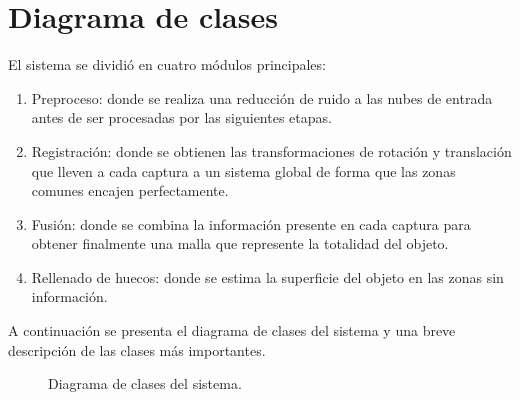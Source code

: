 \section{Diagrama de clases}
El sistema se dividió en cuatro módulos principales:
\begin{enumerate}
	\item Preproceso:
		donde se realiza una reducción de ruido a las nubes de entrada
		antes de ser procesadas por las siguientes etapas.
	\item Registración:
		donde se obtienen las transformaciones de rotación y translación
		que lleven a cada captura a un sistema global
		de forma que las zonas comunes encajen perfectamente.
	\item Fusión:
		donde se combina la información presente en cada captura
		para obtener finalmente una malla que represente la totalidad del objeto.
	\item Rellenado de huecos:
		donde se estima la superficie del objeto en las zonas sin información.
\end{enumerate}

A continuación se presenta el diagrama de clases del sistema y una breve descripción de las clases más importantes.

\begin{figure}[h]
	\caption{\label{fig:diagrama_de_clases}Diagrama de clases del sistema.}
\end{figure}


